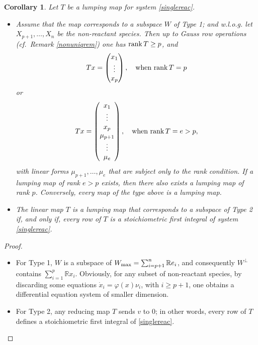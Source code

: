 \documentclass{article}
\newtheorem{corollary}{Corollary}
\begin{document}
\begin{corollary} Let $T$ be a lumping map for system \eqref{singlereac}.
\begin{itemize}
\item Assume that the map corresponds to a subspace $W$ of Type 1; and w.l.o.g. let $X_{p+1},\ldots,X_n$ be the non-reactant species. Then up to Gauss row operations (cf.~Remark \ref{nonuniqrem}) one has ${\rm rank}\,T\geq p$, and 
\[
Tx=\begin{pmatrix} x_1\\ \vdots\\ x_p\end{pmatrix},\quad\text{when  } {\rm rank}\,T=p
\]
or 
\[
Tx=\begin{pmatrix} x_1\\ \vdots\\ x_p\\ \mu_{p+1}\\ \vdots\\ \mu_e\end{pmatrix},\quad\text{when  } {\rm rank}\,T=e>p,
\]
with linear forms $\mu_{p+1},\ldots,\mu_e$ that are subject only to the rank condition. If a lumping map of rank $e>p$ exists, then there also exists a lumping map of rank $p$.
Conversely, every map of the type above is a lumping map. 
\item The linear map $T$ is a lumping map that corresponds to a subspace of Type 2 if, and only if, every row of $T$ is a stoichiometric first integral of system \eqref{singlereac}.
\end{itemize}
\end{corollary}
\begin{proof}
\begin{itemize}
\item For Type 1, $W$ is a subspace of $W_{\rm max}=\sum_{i=p+1}^n \mathbb Re_i$, and consequently $W^\perp$ contains $\sum_{i=1}^p  \mathbb R x_i$. Obviously, for any subset of non-reactant species, by discarding some equations $\dot x_i=\varphi(x)\nu_i$, with $i\geq p+1$,  one obtains a differential equation system of smaller dimension. 
\item For Type 2, any reducing map $T$ sends $v$ to $0$; in other words, every row of $T$ defines a stoichiometric first integral of \eqref{singlereac}.  
\end{itemize}
\end{proof}
\end{document}
